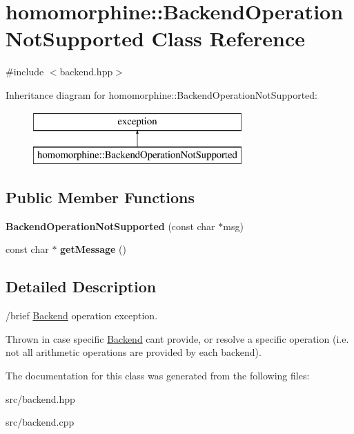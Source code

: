 \hypertarget{classhomomorphine_1_1_backend_operation_not_supported}{}\section{homomorphine\+::Backend\+Operation\+Not\+Supported Class Reference}
\label{classhomomorphine_1_1_backend_operation_not_supported}


{\ttfamily \#include $<$backend.\+hpp$>$}

Inheritance diagram for homomorphine\+::Backend\+Operation\+Not\+Supported\+:\begin{figure}[H]
\begin{center}
\leavevmode
\includegraphics[height=2.000000cm]{classhomomorphine_1_1_backend_operation_not_supported}
\end{center}
\end{figure}
\subsection*{Public Member Functions}
\begin{DoxyCompactItemize}
\item 
\mbox{\label{classhomomorphine_1_1_backend_operation_not_supported_a8db72ebb31be4189807aa36fec1ee927}} 
{\bfseries Backend\+Operation\+Not\+Supported} (const char $\ast$msg)
\item 
\mbox{\label{classhomomorphine_1_1_backend_operation_not_supported_a909fc0802c577f246d5400baba44da45}} 
const char $\ast$ {\bfseries get\+Message} ()
\end{DoxyCompactItemize}


\subsection{Detailed Description}
/brief \mbox{\hyperlink{classhomomorphine_1_1_backend}{Backend}} operation exception.

Thrown in case specific \mbox{\hyperlink{classhomomorphine_1_1_backend}{Backend}} can\textquotesingle{}t provide, or resolve a specific operation (i.\+e. not all arithmetic operations are provided by each backend). 

The documentation for this class was generated from the following files\+:\begin{DoxyCompactItemize}
\item 
src/backend.\+hpp\item 
src/backend.\+cpp\end{DoxyCompactItemize}
